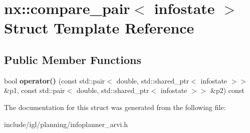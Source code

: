 \hypertarget{structnx_1_1compare__pair}{}\section{nx\+:\+:compare\+\_\+pair$<$ infostate $>$ Struct Template Reference}
\label{structnx_1_1compare__pair}
\subsection*{Public Member Functions}
\begin{DoxyCompactItemize}
\item 
\mbox{\label{structnx_1_1compare__pair_aa41844bf701ea83514d86853433898e2}} 
bool {\bfseries operator()} (const std\+::pair$<$ double, std\+::shared\+\_\+ptr$<$ infostate $>$$>$ \&p1, const std\+::pair$<$ double, std\+::shared\+\_\+ptr$<$ infostate $>$$>$ \&p2) const
\end{DoxyCompactItemize}


The documentation for this struct was generated from the following file\+:\begin{DoxyCompactItemize}
\item 
include/igl/planning/infoplanner\+\_\+arvi.\+h\end{DoxyCompactItemize}
